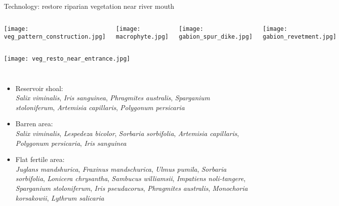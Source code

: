 \begin{frame}{Technology: restore riparian vegetation near river mouth}
\vspace{-0.2cm}
\begin{columns}[T,onlytextwidth]
	
	\texttt{[image: veg\_pattern\_construction.jpg]}
	
	\texttt{[image: macrophyte.jpg]}
	
	\texttt{[image: gabion\_spur\_dike.jpg]}
	
	\texttt{[image: gabion\_revetment.jpg]}
\end{columns}
\vspace{-0.2cm}
\texttt{[image: veg\_resto\_near\_entrance.jpg]}

%
\vspace{-0.4cm}
\begin{columns}[T,onlytextwidth]
	
	\begin{itemize}
		\small
		\item Reservoir shoal:\\
		\tiny
		\emph{Salix viminalis}, \textcolor{colherb}{\emph{Iris sanguinea}}, \textcolor{colherb}{\emph{Phragmites australis}}, \textcolor{colherb}{\emph{Sparganium stoloniferum}}, \textcolor{colherb}{\emph{Artemisia capillaris}}, \textcolor{colherb}{\emph{Polygonum persicaria}}\\
		\small
		\item Barren area:\\
		\tiny
		\emph{Salix viminalis}, \textcolor{colshrub}{\emph{Lespedeza bicolor}}, \textcolor{colshrub}{\emph{Sorbaria sorbifolia}}, \textcolor{colherb}{\emph{Artemisia capillaris}}, \textcolor{colherb}{\emph{Polygonum persicaria}}, \textcolor{colherb}{\emph{Iris sanguinea}}\\
		
		\small
		\item Flat fertile area:\\
		\tiny
		\emph{Juglans mandshurica}, \emph{Fraxinus mandschurica}, \emph{Ulmus pumila}, \textcolor{colshrub}{\emph{Sorbaria sorbifolia}}, \textcolor{colshrub}{\emph{Lonicera chrysantha}}, \textcolor{colshrub}{\emph{Sambucus williamsii}}, \textcolor{colherb}{\emph{Impatiens noli-tangere}}, \textcolor{colherb}{\emph{Sparganium stoloniferum}}, \textcolor{colherb}{\emph{Iris pseudacorus}}, \textcolor{colherb}{\emph{Phragmites australis}}, \textcolor{colherb}{\emph{Monochoria korsakowii}}, \textcolor{colherb}{\emph{Lythrum salicaria}}\\
		

\end{itemize}
\end{columns}
\end{frame}
